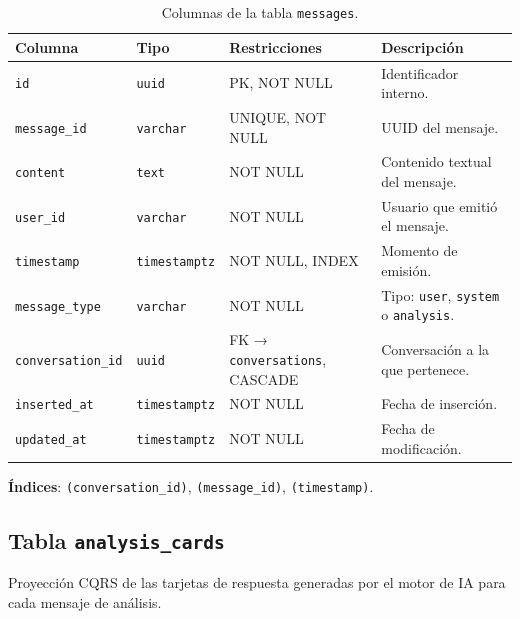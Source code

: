 \begin{table}[h]
\centering
\caption{Columnas de la tabla \texttt{messages}.}
\label{tab:messages}
\begin{tabular}{llp{3.5cm}p{4.5cm}}
\hline
\textbf{Columna} & \textbf{Tipo} & \textbf{Restricciones} & \textbf{Descripción} \\
\hline
\texttt{id}               & \texttt{uuid}        & PK, NOT NULL   & Identificador interno. \\
\texttt{message\_id}      & \texttt{varchar}     & UNIQUE, NOT NULL & UUID del mensaje. \\
\texttt{content}          & \texttt{text}        & NOT NULL       & Contenido textual del mensaje. \\
\texttt{user\_id}         & \texttt{varchar}     & NOT NULL       & Usuario que emitió el mensaje. \\
\texttt{timestamp}        & \texttt{timestamptz} & NOT NULL, INDEX & Momento de emisión. \\
\texttt{message\_type}    & \texttt{varchar}     & NOT NULL       & Tipo: \texttt{user}, \texttt{system} o \texttt{analysis}. \\
\texttt{conversation\_id} & \texttt{uuid}        & FK → \texttt{conversations}, CASCADE & Conversación a la que pertenece. \\
\texttt{inserted\_at}     & \texttt{timestamptz} & NOT NULL       & Fecha de inserción. \\
\texttt{updated\_at}      & \texttt{timestamptz} & NOT NULL       & Fecha de modificación. \\
\hline
\end{tabular}
\end{table}

\textbf{Índices}: \texttt{(conversation\_id)}, \texttt{(message\_id)}, \texttt{(timestamp)}.

\subsection{Tabla \texttt{analysis\_cards}}

Proyección CQRS de las tarjetas de respuesta generadas por el motor de IA para cada mensaje de análisis.

